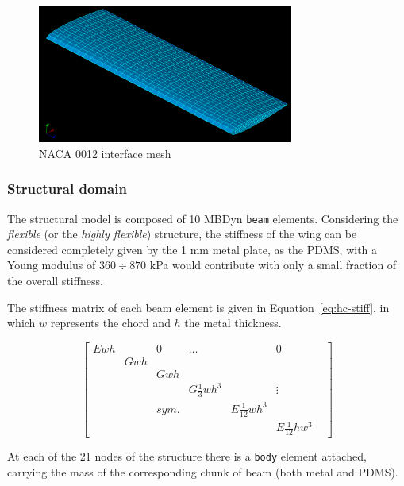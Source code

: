 \begin{figure}[htbp!]
	\centering
	\includegraphics[width=0.75\textwidth]{images/heathcote/interface01.png}
	\caption{NACA 0012 interface mesh}
	\label{fig:hc-interface}
\end{figure}


\subsubsection{Structural domain}

The structural model is composed of 10 MBDyn \texttt{beam} elements. Considering the \textit{flexible} (or the \textit{highly flexible}) structure, the stiffness of the wing can be considered completely given by the 1 \si{mm} metal plate, as the PDMS, with a Young modulus of $360\div870$ \si{kPa} would contribute with only a small fraction of the overall stiffness.

The stiffness matrix of each beam element is given in Equation~\ref{eq:hc-stiff}, in which $w$ represents the chord and $h$ the metal thickness.

\begin{equation}
    \begin{bmatrix} Ewh &  & 0 & \ldots &  & 0 \\
                          & Gwh &  & & & &  \\
                          & & Gwh & & & \\
                          & & & G\frac{1}{3}wh^3 & & \vdots \\
                          & &  sym. & & E\frac{1}{12}wh^3 &  \\
                          & & & & & E\frac{1}{12}hw^3
    \end{bmatrix} 
    \label{eq:hc-stiff}
\end{equation}

At each of the 21 nodes of the structure there is a \texttt{body} element attached, carrying the mass of the corresponding chunk of beam (both metal and PDMS).

